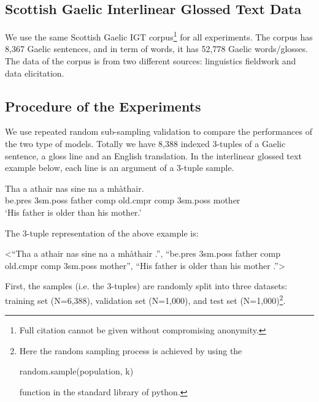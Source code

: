 \documentclass[a4paper]{article}
\begin{document}
\subsection{Scottish Gaelic Interlinear Glossed Text Data}
We use the same Scottish Gaelic IGT corpus\footnote{Full citation cannot be given without compromising anonymity.} for all experiments. The corpus has 8,367 Gaelic sentences, and in term of words, it has 52,778 Gaelic words/glosses. The data of the corpus is from two different sources: linguistics fieldwork and data elicitation.

\subsection{Procedure of the Experiments}
We use repeated random sub-sampling validation to compare the performances of the two type of models.
Totally we have 8,388 indexed 3-tuples of a Gaelic sentence, a gloss line and an English translation. In the interlinear glossed text example below, each line is an argument of a 3-tuple sample.

\begin{exe} 
\ex \gll    Tha a athair nas sine na a mh\`athair.\\ 
           be.pres 3sm.poss father comp old.cmpr comp 3sm.poss mother
\\ 
   \glt    `His father is older than his mother.' 
\end{exe}

The 3-tuple representation of the above example is:
\begin{exe}
\ex <``Tha a athair nas sine na a mh\`athair .'', ``be.pres 3sm.poss father comp old.cmpr comp 3sm.poss mother'', ``His father is older than his mother .''>
\end{exe}

First, the samples (i.e. the 3-tuples) are randomly split into three datasets: training set (N=6,388), validation set (N=1,000), and test set (N=1,000)\footnote{Here the random sampling process is achieved by using the \begin{myfont}random.sample(population, k)\end{myfont} function in the standard library of python.}.
\end{document}
